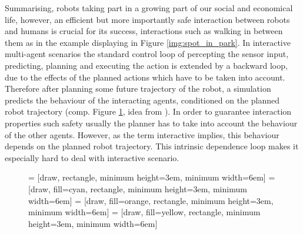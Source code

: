 Summarising, robots taking part in a growing part of our social and economical life, however, an efficient but more importantly safe interaction between robots and humans is crucial for its success, interactions such as walking in between them as in the example displaying in Figure \ref{img:spot_in_park}.
\newline
In interactive multi-agent scenarios the standard control loop of percepting the sensor input, predicting, planning and executing the action \cite{Siegwart2011} is extended by a backward loop, due to the effects of the planned actions which have to be taken into account. Therefore after planning some future trajectory of the robot, a simulation predicts the behaviour of the interacting agents, conditioned on the planned robot trajectory (comp. Figure \ref{fig:control_loop_interactive}, idea from \cite{Romanski2019}). In order to guarantee interaction properties such safety usually the planner has to take into account the behaviour of the other agents. However, as the term interactive implies, this behaviour depends on the planned robot trajectory. This intrinsic dependence loop makes it especially hard to deal with interactive scenario. 

\begin{figure}
\begin{center}
 = [draw, rectangle, minimum height=3em, minimum width=6em]
 = [draw, fill=cyan, rectangle, minimum height=3em, minimum width=6em]
 = [draw, fill=orange, rectangle, minimum height=3em, minimum width=6em]
 = [draw, fill=yellow, rectangle, minimum height=3em, minimum width=6em]
\label{fig:control_loop_interactive}
\end{center}
\end{figure}


